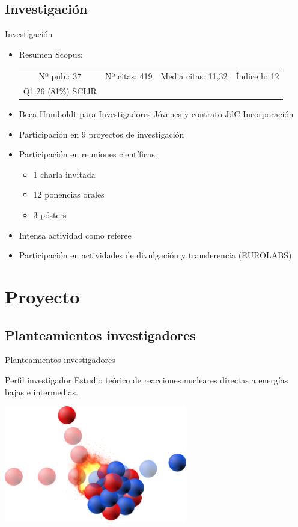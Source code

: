 \documentclass{beamer}
\begin{document}
\subsection{Investigación}
\begin{frame}{Investigación}
    \begin{itemize}
        \item Resumen Scopus:
        \begin{center}
        \begin{tabular}{cccc}
        Nº pub.: 37 & Nº citas: 419 & Media citas: 11,32 & Índice h: 12\\
        \tiny Q1:26 (81\%) SCIJR &&&
        \end{tabular}
        \end{center}
        \item Beca Humboldt para Investigadores Jóvenes y contrato JdC Incorporación
    \item Participación en 9 proyectos de investigación
    \item Participación en reuniones científicas:
    \begin{itemize}
    \item 1 charla invitada
    \item 12 ponencias orales
    \item 3 pósters
    \end{itemize}
    \item Intensa actividad como referee
    \item Participación en actividades de divulgación y transferencia (EUROLABS)
    \end{itemize}
\end{frame}

\section{Proyecto}
\subsection{Planteamientos investigadores}
\begin{frame}{Planteamientos investigadores}
    \begin{block}{Perfil investigador}
       Estudio teórico de reacciones nucleares directas a energías bajas e intermedias.
    \end{block}
    \begin{center}
    \includegraphics[width=0.6\textwidth]{portada.png}
    \end{center}
\end{frame}
\end{document}
